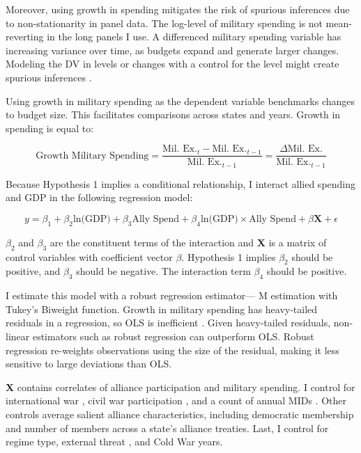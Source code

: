 \documentclass[12pt]{article}
\begin{document}
Moreover, using growth in spending mitigates the risk of spurious inferences due to non-stationarity in panel data. 
The log-level of military spending is not mean-reverting in the long panels I use.
A differenced military spending variable has increasing variance over time, as budgets expand and generate larger changes. 
Modeling the DV in levels or changes with a control for the level might create spurious inferences \citep{GrangerNewbold1974}. 


Using growth in military spending as the dependent variable benchmarks changes to budget size. 
This facilitates comparisons across states and years. 
Growth in spending is equal to: 


\begin{equation}
\mbox{Growth Military Spending} = \frac{\mbox{Mil. Ex.}_t - \mbox{Mil. Ex.}_{t-1} }{ \mbox{Mil. Ex.}_{t-1} } = \frac{\Delta \mbox{Mil. Ex.} }{ \mbox{Mil. Ex.}_{t-1} }
\end{equation} 


Because Hypothesis 1 implies a conditional relationship, I interact allied spending and GDP in the following regression model:

\begin{equation} 
y = \beta_1 + \beta_2 \mbox{ln(GDP)} + \beta_3 \mbox{Ally Spend} + \beta_4 \mbox{ln(GDP)} \times \mbox{Ally Spend} + \beta \mathbf{X} + \epsilon
\end{equation}


$\beta_2$ and $\beta_3$ are the constituent terms of the interaction and \textbf{X} is a matrix of control variables with coefficient vector $\beta$.
Hypothesis 1 implies $\beta_2$ should be positive, and $\beta_3$ should be negative. 
The interaction term $\beta_4$ should be positive. 


I estimate this model with a robust regression estimator--- M estimation with Tukey's Biweight function. 
Growth in military spending has heavy-tailed residuals in a regression, so OLS is inefficient \citep{RaineyBaissa2018}. 
Given heavy-tailed residuals, non-linear estimators such as robust regression can outperform OLS. 
Robust regression re-weights observations using the size of the residual, making it less sensitive to large deviations than OLS. 


\textbf{X} contains correlates of alliance participation and military spending. 
I control for international war \citep{Reiteretal2016}, civil war participation \citep{SarkeesWayman2010}, and a count of annual MIDs \citep{Gibleretal2016}. 
Other controls average salient alliance characteristics, including democratic membership \citep{DigiuseppePoast2016} and number of members across a state's alliance treaties.   
Last, I control for regime type, external threat \citep{LeedsSavun2007}, and Cold War years. 
\end{document}
